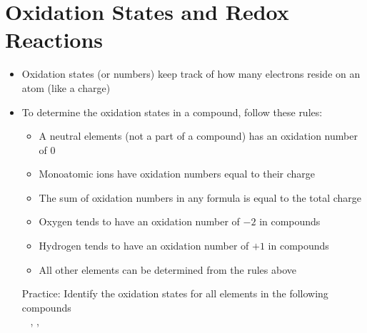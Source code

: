 \documentclass[12pt, openany, letterpaper]{memoir}
\begin{document}
\section{Oxidation States and Redox Reactions}
\begin{itemize}
	\item Oxidation states (or numbers) keep track of how many electrons reside on an atom (like a charge)
	\item To determine the oxidation states in a compound, follow these rules:
	      \begin{itemize}
		      \item A neutral elements (not a part of a compound) has an oxidation number of $0$
		      \item Monoatomic ions have oxidation numbers equal to their charge
		      \item The sum of oxidation numbers in any formula is equal to the total charge
		      \item Oxygen tends to have an oxidation number of $-2$ in compounds
		      \item Hydrogen tends to have an oxidation number of $+1$ in compounds
		      \item All other elements can be determined from the rules above
	      \end{itemize}

	      Practice: Identify the oxidation states for all elements in the following compounds\\
	      ~\hphantom{Practice: } , , 


\end{itemize}
\end{document}
